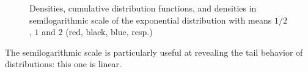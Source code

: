 \documentclass{beamer}
\begin{document}
\begin{frame}[allowframebreaks]
\begin{figure}[hbt]
\centering
{}
\caption{Densities, cumulative distribution functions, and densities in semilogarithmic scale of the exponential distribution with means $1/2$, $1$ and $2$ (red, black, blue, resp.)}\label{Fig:ExponentialDistribution}
\end{figure}

The semilogarithmic scale is particularly useful at revealing the tail behavior of distributions: this one is linear.
\end{frame}
\end{document}
